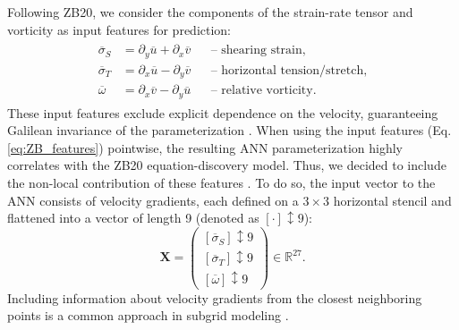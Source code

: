 \documentclass[draft]{agujournal2019}
\begin{document}
Following ZB20, we consider the components of the strain-rate tensor and vorticity as input features for prediction:
\begin{gather}
    \begin{aligned}
        \overline{\sigma}_S & = \partial_y \overline{u} + \partial_x \overline{v} && \text{-- shearing strain,} \\
        \overline{\sigma}_T & = \partial_x \overline{u} - \partial_y \overline{v} && \text{-- horizontal tension/stretch,} \\
        \overline{\omega} & = \partial_x \overline{v} - \partial_y \overline{u} && \text{-- relative vorticity.}
    \end{aligned} \label{eq:ZB_features}
\end{gather}
These input features exclude explicit dependence on the velocity, guaranteeing Galilean invariance of the parameterization \cite{srinivasan2024turbulence,pope1975more, lund1993parameterization, ling2016reynolds}. When using the input features (Eq. \eqref{eq:ZB_features}) pointwise, the resulting ANN parameterization highly correlates with the ZB20 equation-discovery model. Thus, we decided to include the non-local contribution of these features \cite{srinivasan2024turbulence}. To do so, the input vector to the ANN consists of velocity gradients, each defined on a $3 \times 3$ horizontal stencil and flattened into a vector of length 9 (denoted as $\left[ \cdot \right]{\updownarrow \scriptstyle 9}$):
\begin{equation}
    \mathbf{X} =
    \begin{pmatrix}
        \left[ \overline{\sigma}_S \right]{\updownarrow \scriptstyle 9}  \\
        \left[ \overline{\sigma}_T \right]{\updownarrow \scriptstyle 9} \\
        \left[ \overline{\omega} \right]{\updownarrow \scriptstyle 9}
    \end{pmatrix} \in \mathbb{R}^{27}. \label{eq:stack_features}
\end{equation}
Including information about velocity gradients from the closest neighboring points is a common approach in subgrid modeling \cite{maulik2017neural, maulik2019subgrid, pawar2020priori, wang2021artificial, wang2022constant, gultekin2024analysis}.
\end{document}
